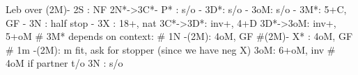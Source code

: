 Leb over (2M)-
2S : NF
2N*->3C*- P* : s/o
        - 3D*: s/o
        - 3oM: s/o
        - 3M*: 5+C, GF
        - 3N : half stop
   - 3X : 18+, nat
3C*->3D*: inv+, 4+D
3D*->3oM: inv+, 5+oM
# 3M* depends on context: 
# 1N -(2M): 4oM, GF 
#(2M)- X* : 4oM, GF 
# 1m -(2M): m fit, ask for stopper (since we have neg X)
3oM: 6+oM, inv  # 4oM if partner t/o
3N : s/o